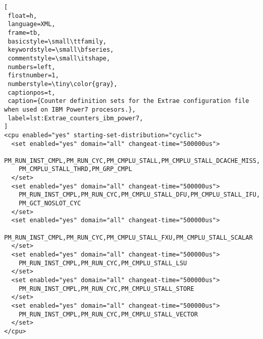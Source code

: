 \begin{lstlisting}[
 float=h,
 language=XML,
 frame=tb,
 basicstyle=\small\ttfamily,
 keywordstyle=\small\bfseries,
 commentstyle=\small\itshape,
 numbers=left,
 firstnumber=1,
 numberstyle=\tiny\color{gray},
 captionpos=t,
 caption={Counter definition sets for the Extrae configuration file when used on IBM Power7 procesors.},
 label=lst:Extrae_counters_ibm_power7,
]
<cpu enabled="yes" starting-set-distribution="cyclic">
  <set enabled="yes" domain="all" changeat-time="500000us">
    PM_RUN_INST_CMPL,PM_RUN_CYC,PM_CMPLU_STALL,PM_CMPLU_STALL_DCACHE_MISS,
    PM_CMPLU_STALL_THRD,PM_GRP_CMPL
  </set>
  <set enabled="yes" domain="all" changeat-time="500000us">
    PM_RUN_INST_CMPL,PM_RUN_CYC,PM_CMPLU_STALL_DFU,PM_CMPLU_STALL_IFU,
    PM_GCT_NOSLOT_CYC
  </set>
  <set enabled="yes" domain="all" changeat-time="500000us">
    PM_RUN_INST_CMPL,PM_RUN_CYC,PM_CMPLU_STALL_FXU,PM_CMPLU_STALL_SCALAR
  </set>
  <set enabled="yes" domain="all" changeat-time="500000us">
    PM_RUN_INST_CMPL,PM_RUN_CYC,PM_CMPLU_STALL_LSU
  </set>
  <set enabled="yes" domain="all" changeat-time="500000us">
    PM_RUN_INST_CMPL,PM_RUN_CYC,PM_CMPLU_STALL_STORE
  </set>
  <set enabled="yes" domain="all" changeat-time="500000us">
    PM_RUN_INST_CMPL,PM_RUN_CYC,PM_CMPLU_STALL_VECTOR
  </set>
</cpu>
\end{lstlisting}
